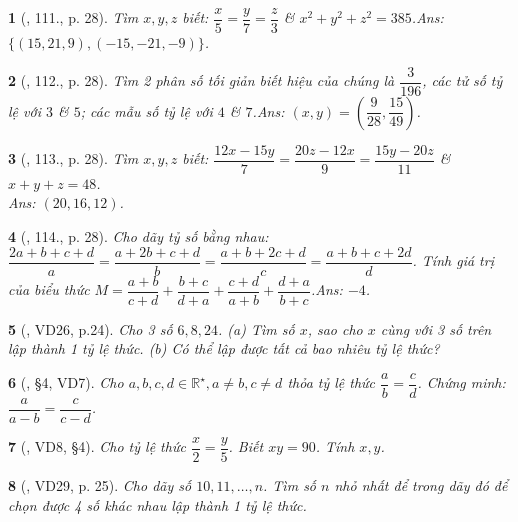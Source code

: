 \documentclass{article}
\newtheorem{baitoan}{}
\begin{document}
\begin{baitoan}[\cite{Tuyen_Toan_7}, 111., p. 28]
	Tìm $x,y,z$ biết: $\dfrac{x}{5} = \dfrac{y}{7} = \dfrac{z}{3}$ \& $x^2 + y^2 + z^2 = 385$.\hfill{\sf Ans:} $\{(15,21,9),(-15,-21,-9)\}$.
\end{baitoan}

\begin{baitoan}[\cite{Tuyen_Toan_7}, 112., p. 28]
	Tìm 2 phân số tối giản biết hiệu của chúng là $\dfrac{3}{196}$, các tử số tỷ lệ với $3$ \& $5$; các mẫu số tỷ lệ với $4$ \& $7$.\hfill{\sf Ans:} $(x,y) = \left(\dfrac{9}{28},\dfrac{15}{49}\right)$.
\end{baitoan}

\begin{baitoan}[\cite{Tuyen_Toan_7}, 113., p. 28]
	Tìm $x,y,z$ biết: $\dfrac{12x - 15y}{7} = \dfrac{20z - 12x}{9} = \dfrac{15y - 20z}{11}$ \& $x + y + z = 48$.\\\mbox{}\hfill{\sf Ans:} $(20,16,12)$.
\end{baitoan}

\begin{baitoan}[\cite{Tuyen_Toan_7}, 114., p. 28]
	Cho dãy tỷ số bằng nhau: $\dfrac{2a + b + c + d}{a} = \dfrac{a + 2b + c + d}{b} = \dfrac{a + b + 2c + d}{c} = \dfrac{a + b + c + 2d}{d}$. Tính giá trị của biểu thức $M = \dfrac{a + b}{c + d} + \dfrac{b + c}{d + a} + \dfrac{c + d}{a + b} + \dfrac{d + a}{b + c}$.\hfill{\sf Ans:} $-4$.
\end{baitoan}

\begin{baitoan}[\cite{Binh_Toan_7_tap_1}, VD26, p.24]
	Cho 3 số $6,8,24$. (a) Tìm số $x$, sao cho $x$ cùng với 3 số trên lập thành 1 tỷ lệ thức. (b) Có thể lập được tất cả bao nhiêu tỷ lệ thức?
\end{baitoan}

\begin{baitoan}[\cite{Binh_Toan_7_tap_1}, \S4, VD7]
	Cho $a,b,c,d\in\mathbb{R}^\star,a\ne b,c\ne d$ thỏa tỷ lệ thức $\dfrac{a}{b} = \dfrac{c}{d}$. Chứng minh: $\dfrac{a}{a - b} = \dfrac{c}{c - d}$.
\end{baitoan}

\begin{baitoan}[\cite{Binh_Toan_7_tap_1}, VD8, \S4]
	Cho tỷ lệ thức $\dfrac{x}{2} = \dfrac{y}{5}$. Biết $xy = 90$. Tính $x,y$.
\end{baitoan}

\begin{baitoan}[\cite{Binh_Toan_7_tap_1}, VD29, p. 25]
	Cho dãy số $10,11,\ldots,n$. Tìm số $n$ nhỏ nhất để trong dãy đó để chọn được 4 số khác nhau lập thành 1 tỷ lệ thức.
\end{baitoan}
\end{document}
